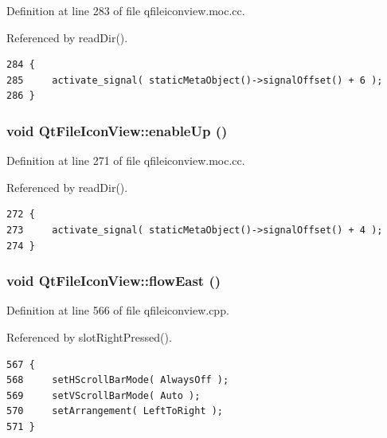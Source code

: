 Definition at line 283 of file qfileiconview.moc.cc.

Referenced by read\-Dir().



\footnotesize\begin{verbatim}284 {
285     activate_signal( staticMetaObject()->signalOffset() + 6 );
286 }
\end{verbatim}\normalsize 
{}
\subsubsection{\setlength{\rightskip}{0pt plus 5cm}void Qt\-File\-Icon\-View::enable\-Up ()\hspace{0.3cm}{\tt  [signal]}}\label{classQtFileIconView_QtFileIconViewl4}




Definition at line 271 of file qfileiconview.moc.cc.

Referenced by read\-Dir().



\footnotesize\begin{verbatim}272 {
273     activate_signal( staticMetaObject()->signalOffset() + 4 );
274 }
\end{verbatim}\normalsize 
{}
\subsubsection{\setlength{\rightskip}{0pt plus 5cm}void Qt\-File\-Icon\-View::flow\-East ()\hspace{0.3cm}{\tt  [protected, slot]}}\label{classQtFileIconView_QtFileIconViewj7}




Definition at line 566 of file qfileiconview.cpp.

Referenced by slot\-Right\-Pressed().



\footnotesize\begin{verbatim}567 {
568     setHScrollBarMode( AlwaysOff );
569     setVScrollBarMode( Auto );
570     setArrangement( LeftToRight );
571 }
\end{verbatim}\normalsize 
{}
